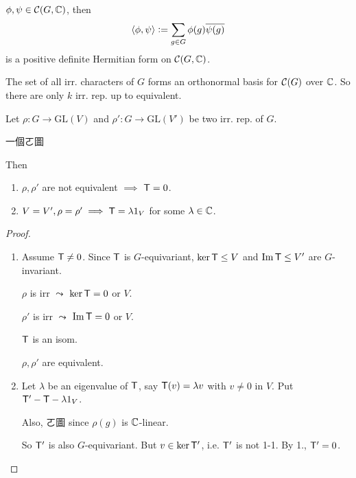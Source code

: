 \begin{definition}
  $\phi, \psi \in \mathcal{C}(G, \mathbb{C})$, then
  \[ \langle\phi, \psi\rangle \vcentcolon= \sum_{g\in G} \phi(g) \overline{\psi(g)} \]
  is a positive definite Hermitian form on $\mathcal{C}(G, \mathbb{C})$.
\end{definition}

\begin{theorem}
  The set of all irr. characters of $G$ forms an orthonormal basis for $\mathcal{C}(G)$
  over $\mathbb{C}$. So there are only $k$ irr. rep. up to equivalent.
\end{theorem}

\begin{lemma}
  Let $\rho: G \to \text{GL}(V)$ and $\rho': G\to \text{GL}(V')$ be two irr.
  rep. of $G$.
  
  一個ㄛ圖

  Then
  \begin{enumerate}
    \item $\rho, \rho'$ are not equivalent $\implies$ ${\sf T} = 0$.
    \item $V = V', \rho = \rho' \implies {\sf T} = \lambda 1_V$ for some
      $\lambda \in \mathbb{C}$.
  \end{enumerate}

  \begin{proof}
    \begin{enumerate}
      \item Assume ${\sf T} \ne 0$. Since ${\sf T}$ is $G$-equivariant,
        $\ker {\sf T} \le V$ and $\operatorname{Im} {\sf T}\le V'$ are $G$-invariant.

        $\rho$ is irr $\leadsto$ $\ker {\sf T} = 0$ or $V$.

        $\rho'$ is irr $\leadsto$ $\operatorname{Im} {\sf T} = 0$ or $V$.

        ${\sf T}$ is an isom.

        $\rho, \rho'$ are equivalent.

      \item  Let $\lambda$ be an eigenvalue of ${\sf T}$, say
        ${\sf T}(v) = \lambda v$ with $v \ne 0$ in $V$.
        Put ${\sf T}' - {\sf T} - \lambda 1_V$.

        Also, ㄛ圖 since $\rho(g)$ is $\mathbb{C}$-linear.

        So ${\sf T}'$ is also $G$-equivariant. But $v \in \ker {\sf T}'$,
        i.e. ${\sf T}'$ is not 1-1. By 1., ${\sf T'} = 0$.
    \end{enumerate}
  \end{proof}
\end{lemma}

